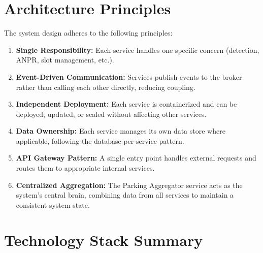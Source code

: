 \documentclass[12pt,a4paper]{report}
\begin{document}
\section{Architecture Principles}

The system design adheres to the following principles:

\begin{enumerate}
    \item \textbf{Single Responsibility:} Each service handles one specific concern (detection, ANPR, slot management, etc.).
    \item \textbf{Event-Driven Communication:} Services publish events to the broker rather than calling each other directly, reducing coupling.
    \item \textbf{Independent Deployment:} Each service is containerized and can be deployed, updated, or scaled without affecting other services.
    \item \textbf{Data Ownership:} Each service manages its own data store where applicable, following the database-per-service pattern.
    \item \textbf{API Gateway Pattern:} A single entry point handles external requests and routes them to appropriate internal services.
    \item \textbf{Centralized Aggregation:} The Parking Aggregator service acts as the system's central brain, combining data from all services to maintain a consistent system state.
\end{enumerate}

\section{Technology Stack Summary}
\end{document}
